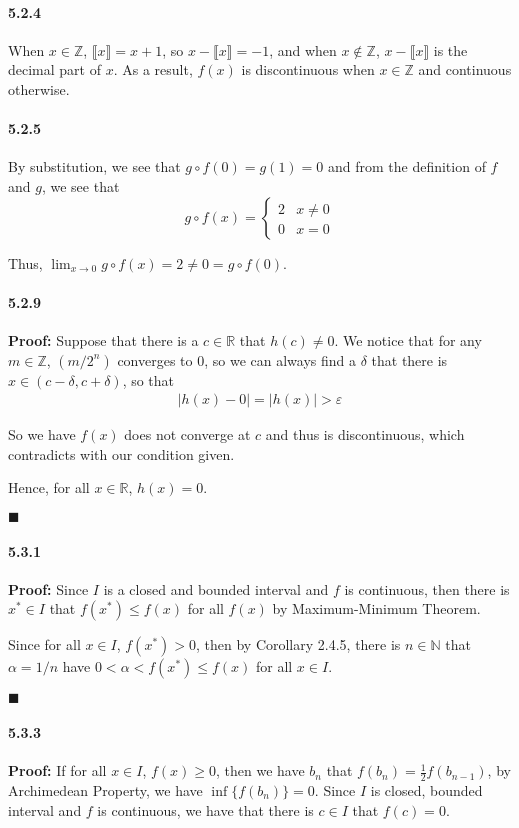 \documentclass[11pt]{article}
\newcommand{\qed}{
	\begin{flushright}
		$\blacksquare$
	\end{flushright}}
\begin{document}
	\paragraph{5.2.4}
		When $x \in \mathbb{Z}$, $\llbracket x\rrbracket = x + 1$, so $x - \llbracket x\rrbracket = -1$, and when $x \notin \mathbb{Z}$, $x - \llbracket x\rrbracket$ is the decimal part of $x$. As a result, $f(x)$ is discontinuous when $x \in \mathbb{Z}$ and continuous otherwise.
	\paragraph{5.2.5}
		By substitution, we see that $g \circ f(0) = g(1) = 0$ and from the definition of $f$ and $g$, we see that 
			\[g \circ f(x) = \begin{cases}
				2 & x \neq 0\\
				0 & x = 0
			\end{cases} \] 
			
		Thus, $\lim_{x \rightarrow 0} g \circ f(x) = 2 \neq 0 = g \circ f(0)$.
	\paragraph{5.2.9}\textbf{Proof:} Suppose that there is a $c \in \mathbb{R}$ that $h(c) \neq 0$. We notice that for any $m \in \mathbb{Z}$, $(m/2^n)$ converges to $0$, so we can always find a $\delta$ that there is $x \in (c - \delta, c + \delta)$, so that
			\begin{align}
				|h(x) - 0| = |h(x)| > \varepsilon\nonumber
			\end{align}
			
		So we have $f(x)$ does not converge at $c$ and thus is discontinuous, which contradicts with our condition given.
			
		Hence, for all $x \in \mathbb{R}$, $h(x) = 0$.
		\qed
	\paragraph{5.3.1}\textbf{Proof:}
		Since $I$ is a closed and bounded interval and $f$ is continuous, then there is $x^* \in I$ that $f(x^*) \leq f(x)$ for all $f(x)$ by Maximum-Minimum Theorem.
		
		Since for all $x \in I$, $f(x^*) > 0$, then by Corollary 2.4.5, there is $n \in \mathbb{N}$ that $\alpha = 1/n$ have $0 < \alpha < f(x^*) \leq f(x)$ for all $x \in I$.
		\qed
	\paragraph{5.3.3}\textbf{Proof:} If for all $x \in I$, $f(x) \geq 0$, then we have $b_n$ that $f(b_n) = \frac{1}{2}f(b_{n - 1})$, by Archimedean Property, we have $\inf \{f(b_n)\} = 0$. Since $I$ is closed, bounded interval and $f$ is continuous, we have that there is $c \in I$ that $f(c) = 0$.
	
\end{document}
